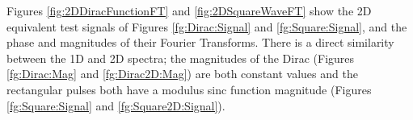 Figures \ref{fig:2DDiracFunctionFT} and \ref{fig:2DSquareWaveFT} show the 2D equivalent test signals of Figures \ref{fg:Dirac:Signal} and \ref{fg:Square:Signal}, and the phase and magnitudes of their Fourier Transforms. There is a direct similarity between the 1D and 2D spectra; the magnitudes of the Dirac (Figures \ref{fg:Dirac:Mag} and \ref{fg:Dirac2D:Mag}) are both constant values and the rectangular pulses both have a modulus sinc function magnitude (Figures \ref{fg:Square:Signal} and \ref{fg:Square2D:Signal}). 

\begin{figure}
\centering
{}

\end{figure}
